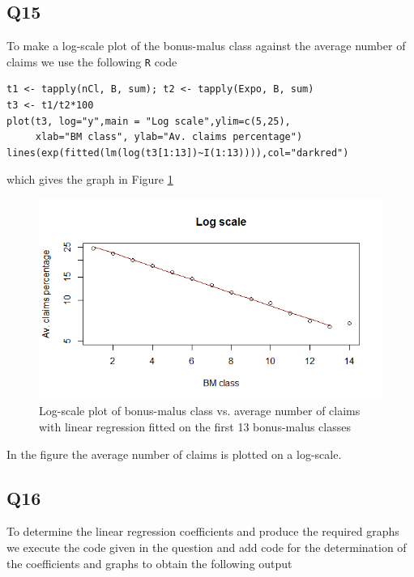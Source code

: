 \documentclass[11pt]{article}
\begin{document}
\subsection*{Q15}
To make a log-scale plot of the bonus-malus class against the average number of claims we use the following \verb|R| code
\begin{verbatim}
t1 <- tapply(nCl, B, sum); t2 <- tapply(Expo, B, sum)
t3 <- t1/t2*100
plot(t3, log="y",main = "Log scale",ylim=c(5,25),
     xlab="BM class", ylab="Av. claims percentage")
lines(exp(fitted(lm(log(t3[1:13])~I(1:13)))),col="darkred")
\end{verbatim}
which gives the graph in Figure \ref{Figure_Question15}
\begin{center}
\begin{figure}[h]

\includegraphics[scale=0.8]{Q15_LogScalePlot.png}

\caption{Log-scale plot of bonus-malus class vs. average number of claims with linear regression fitted on the first 13 bonus-malus classes}
\label{Figure_Question15}

\end{figure}
\end{center}

In the figure the average number of claims is plotted on a log-scale.


\subsection*{Q16}

To determine the linear regression coefficients and produce the required graphs we execute the code given in the question and add code for the determination of the coefficients and graphs to obtain the following output
\end{document}
